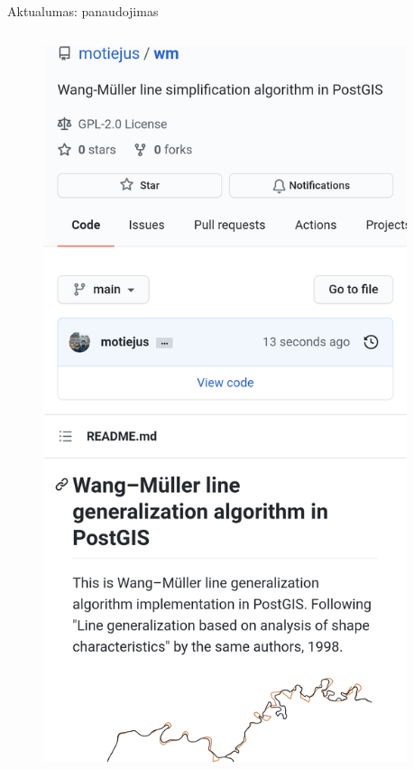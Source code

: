 \documentclass[14pt]{beamer}
\begin{document}
\begin{frame}{Aktualumas: panaudojimas}
  \begin{columns}[c]
    \begin{column}{.3\textwidth}
      \begin{figure}[ht]
        \includegraphics[width=\textwidth]{github-wm}
      \end{figure}
    \end{column}
    \begin{column}{.7\textwidth}
      \begin{itemize}


\end{itemize}
\end{column}
\end{columns}
\end{frame}
\end{document}
